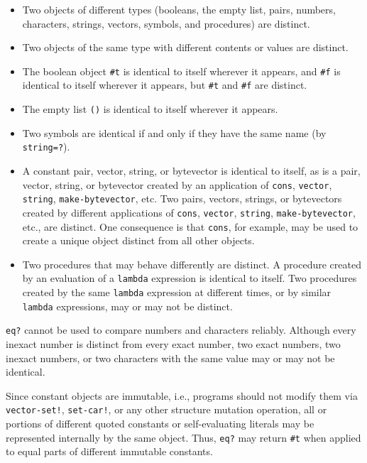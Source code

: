 \begin{itemize}
\item 
Two objects of different types
(booleans, the empty list, pairs, numbers, characters, strings,
vectors, symbols, and procedures)
are distinct.

\item 
Two objects of the same type with different contents or values are distinct.

\item 
The boolean object \texttt{\#{}t} is identical to itself wherever it
appears, and \texttt{\#{}f} is identical to itself wherever it appears,
but \texttt{\#{}t} and \texttt{\#{}f} are distinct.

\item 
The empty list \texttt{()} is identical to itself wherever it appears.

\item 
Two symbols are identical if and only if they have the same name (by
\texttt{string=?}).

\item 
A constant pair, vector, string, or bytevector is identical to itself, as is a
pair, vector, string, or bytevector created by an application of \texttt{cons},
\texttt{vector}, \texttt{string}, \texttt{make-bytevector}, etc.
Two pairs, vectors, strings, or bytevectors created by different applications
of \texttt{cons}, \texttt{vector}, \texttt{string}, \texttt{make-bytevector},
etc., are distinct.
One consequence is that \texttt{cons}, for example, may be used to create
a unique object distinct from all other objects.

\item 
Two procedures that may behave differently are distinct.
A procedure created by an evaluation of a
\texttt{lambda} expression is identical to itself.
Two procedures created by the same \texttt{lambda} expression at different
times, or by similar \texttt{lambda} expressions, may or may not be
distinct.

\end{itemize}

\texttt{eq?} cannot be used to compare numbers and characters
reliably.
Although every inexact number is distinct from every exact number,
two exact numbers, two inexact numbers, or two characters with the
same value may or may not be identical.

Since constant objects are immutable, i.e., programs should not modify them via
\texttt{vector-set!}, \texttt{set-car!}, or any other structure mutation
operation,
all or portions of different quoted constants or self-evaluating
literals may be represented internally by the same object.
Thus, \texttt{eq?} may return \texttt{\#{}t} when applied to equal parts of different
immutable constants.

